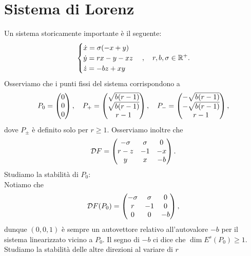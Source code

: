 \section{Sistema di Lorenz}
Un sistema storicamente importante \`e il seguente:
\[\begin{cases}
\dot x = \sigma(-x+y)\\
\dot y = rx-y-xz\\
\dot z = -bz+xy
\end{cases},\quad r,b,\sigma\in\mathbb{R}^+.\]
Osserviamo che i punti fissi del sistema corrispondono a
\[P_0=\begin{pmatrix}0\\0\\0\end{pmatrix},\quad P_+=\begin{pmatrix}\sqrt{b(r-1)}\\\sqrt{b(r-1)}\\r-1\end{pmatrix},\quad P_-=\begin{pmatrix}-\sqrt{b(r-1)}\\-\sqrt{b(r-1)}\\r-1\end{pmatrix},\]
dove $P_\pm$ \`e definito solo per $r\geq1$. Osserviamo inoltre che
\[\mathcal{D} F=\begin{pmatrix}-\sigma&\sigma&0\\r-z&-1&-x\\y&x&-b\end{pmatrix}.\]
Studiamo la stabilit\`a di $P_0$:\\
Notiamo che
\[\mathcal{D} F(P_0)=\begin{pmatrix}-\sigma&\sigma&0\\
r&-1&0\\0&0&-b\end{pmatrix},\]
dunque $(0,0,1)$ \`e sempre un autovettore relativo all'autovalore $-b$ per il sistema linearizzato vicino a $P_0$. Il segno di $-b$ ci dice che $\dim E^s(P_0)\geq1$. Studiamo la stabilit\`a delle altre direzioni al variare di $r$ 
\setlength{\leftmargini}{0cm}
